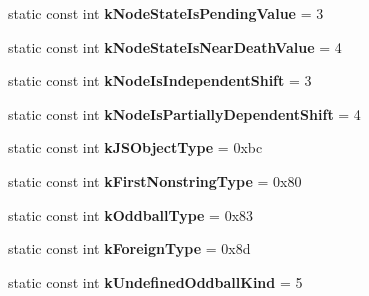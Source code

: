\begin{DoxyCompactItemize}
\item 
\hypertarget{classv8_1_1internal_1_1Internals_a843b53b17257ecd957eade0d9f21c5ab}{}static const int {\bfseries k\+Node\+State\+Is\+Pending\+Value} = 3\label{classv8_1_1internal_1_1Internals_a843b53b17257ecd957eade0d9f21c5ab}

\item 
\hypertarget{classv8_1_1internal_1_1Internals_a18f3e757639b07bdabb8cda7dd4a8bdb}{}static const int {\bfseries k\+Node\+State\+Is\+Near\+Death\+Value} = 4\label{classv8_1_1internal_1_1Internals_a18f3e757639b07bdabb8cda7dd4a8bdb}

\item 
\hypertarget{classv8_1_1internal_1_1Internals_a228b2b58c77c17bc512b92d9e3aea48b}{}static const int {\bfseries k\+Node\+Is\+Independent\+Shift} = 3\label{classv8_1_1internal_1_1Internals_a228b2b58c77c17bc512b92d9e3aea48b}

\item 
\hypertarget{classv8_1_1internal_1_1Internals_aeda4d6fc1bd10ca57398597f3bb496f3}{}static const int {\bfseries k\+Node\+Is\+Partially\+Dependent\+Shift} = 4\label{classv8_1_1internal_1_1Internals_aeda4d6fc1bd10ca57398597f3bb496f3}

\item 
\hypertarget{classv8_1_1internal_1_1Internals_a56b7062df5d9a7df491137d4c3341bcc}{}static const int {\bfseries k\+J\+S\+Object\+Type} = 0xbc\label{classv8_1_1internal_1_1Internals_a56b7062df5d9a7df491137d4c3341bcc}

\item 
\hypertarget{classv8_1_1internal_1_1Internals_a6f4a54927b01a11f444fb2f00b47ca1d}{}static const int {\bfseries k\+First\+Nonstring\+Type} = 0x80\label{classv8_1_1internal_1_1Internals_a6f4a54927b01a11f444fb2f00b47ca1d}

\item 
\hypertarget{classv8_1_1internal_1_1Internals_a13081e936f8c96472f1b1496c70d4dc1}{}static const int {\bfseries k\+Oddball\+Type} = 0x83\label{classv8_1_1internal_1_1Internals_a13081e936f8c96472f1b1496c70d4dc1}

\item 
\hypertarget{classv8_1_1internal_1_1Internals_a263195f36f9e8ee64af70dc267a85d55}{}static const int {\bfseries k\+Foreign\+Type} = 0x8d\label{classv8_1_1internal_1_1Internals_a263195f36f9e8ee64af70dc267a85d55}

\item 
\hypertarget{classv8_1_1internal_1_1Internals_a39072b9e0ffea4031f4a1c514208b20d}{}static const int {\bfseries k\+Undefined\+Oddball\+Kind} = 5\label{classv8_1_1internal_1_1Internals_a39072b9e0ffea4031f4a1c514208b20d}


\end{DoxyCompactItemize}
